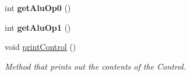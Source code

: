 \begin{DoxyCompactItemize}
\mbox{\label{class_control_unit_a5f88deaa3119aa38812edd8cf1d75b70}} 
int {\bfseries get\+Alu\+Op0} ()
\item 
\mbox{\label{class_control_unit_abeb8981fe2c90430b6aca8fa14ae9cab}} 
int {\bfseries get\+Alu\+Op1} ()
\item 
\mbox{\label{class_control_unit_a103986a57f14e0b13da4e5785d8bb034}} 
void \mbox{\hyperlink{class_control_unit_a103986a57f14e0b13da4e5785d8bb034}{print\+Control}} ()
\begin{DoxyCompactList}\small\item\em Method that prints out the contents of the Control. \end{DoxyCompactList}\end{DoxyCompactItemize}
